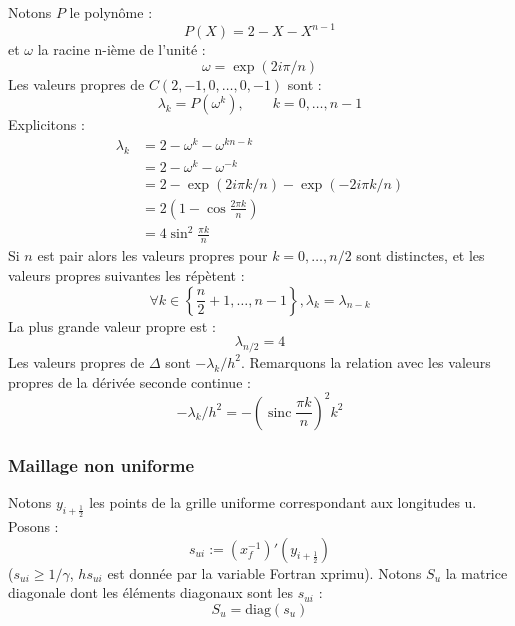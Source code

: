 \documentclass[a4paper,english,french]{article}
\DeclareMathOperator{\sinc}{sinc}
\begin{document}
Notons $P$ le polynôme :
\begin{equation*}
  P(X) = 2 - X - X^{n - 1}
\end{equation*}
et $\omega$ la racine n-ième de l'unité :
\begin{equation*}
  \omega = \exp(2 i \pi / n)
\end{equation*}
Les valeurs propres de $C(2, -1, 0, \dots, 0, - 1)$ sont :
\begin{equation*}
  \lambda_k = P(\omega^k), \qquad k = 0, \dots, n - 1
\end{equation*}
Explicitons :
\begin{align*}
  \lambda_k & = 2 - \omega^k - \omega^{k n - k} \\
  & = 2 - \omega^k - \omega^{- k} \\
  & = 2 - \exp(2 i \pi k / n) - \exp(- 2 i \pi k / n) \\
  & = 2 \left(1 - \cos \frac{2 \pi k}{n} \right) \\
  & = 4 \sin^2 \frac{\pi k}{n}
\end{align*}
Si $n$ est pair alors les valeurs propres pour $k = 0, \dots, n / 2$
sont distinctes, et les valeurs propres suivantes les répètent :
\begin{equation*}
  \forall k \in \left\{\frac{n}{2} + 1, \dots, n - 1 \right\},
  \lambda_k = \lambda_{n - k}
\end{equation*}
La plus grande valeur propre est :
\begin{equation*}
  \lambda_{n / 2} = 4
\end{equation*}
Les valeurs propres de $\Delta$ sont $- \lambda_k / h^2$. Remarquons
la relation avec les valeurs propres de la dérivée seconde continue :
\begin{equation*}
  - \lambda_k / h^2 = - \left(\sinc \frac{\pi k}{n} \right)^2 k^2
\end{equation*}

\subsubsection{Maillage non uniforme}
\label{sec:non_uniform}

Notons $y_{i + \frac{1}{2}}$ les points de la grille uniforme
correspondant aux longitudes u. Posons :
\begin{equation*}
  s_{ui} := (x_f^{-1})'(y_{i + \frac{1}{2}})
\end{equation*}
($s_{ui} \ge 1 / \gamma$, $h s_{ui}$ est donnée par la variable Fortran
xprimu). Notons $S_u$ la matrice diagonale dont les éléments diagonaux sont
les $s_{ui}$ :
\begin{equation}
  \label{eq:S_u}
  S_u = \mathrm{diag}(s_u)
\end{equation}
\end{document}
